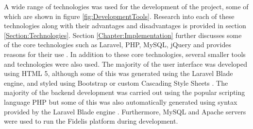 A wide range of technologies was used for the development of the project, some of which are shown in figure \ref{fig:DevelopmentTools}. Research into each of these technologies along with their advantages and disadvantages is provided in section \ref{Section:Technologies}. Section \ref{Chapter:Implementation} further discusses some of the core technologies such as Laravel, PHP, MySQL, jQuery and provides reasons for their use \cite{Laravel:Home, PHP:Home, MySQL:Home, jQuery:Home}. In addition to these core technologies, several smaller tools and technologies were also used. The majority of the user interface was developed using HTML 5, although some of this was generated using the Laravel Blade engine, and styled using Bootstrap or custom Cascading Style Sheets \cite{W3:HTML5, Bootstrap:Home, W3:CSS}. The majority of the backend development was carried out using the popular scripting language PHP but some of this was also automatically generated using syntax provided by the Laravel Blade engine \cite{PHP:Home, Laravel:Blade}. Furthermore, MySQL and Apache servers \cite{MySQL:Home, Apache:Home} were used to run the Fidelis platform during development.

